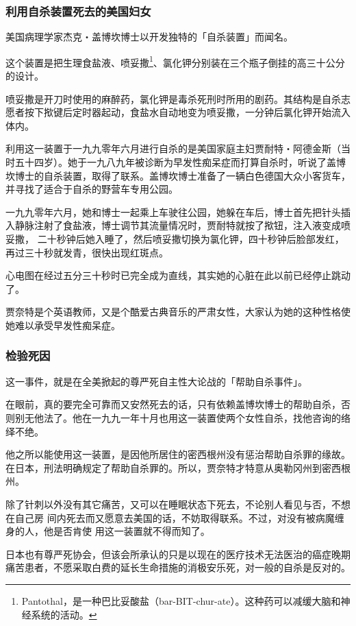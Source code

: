 \documentclass[UTF8]{ctexart}
\begin{document}
\subsubsection*{利用自杀装置死去的美国妇女}

美国病理学家杰克‧盖博坎博士以开发独特的「自杀装置」而闻名。

这个装置是把生理食盐液、喷妥撒\footnote{Pantothal，是一种巴比妥酸盐（bar-BIT-chur-ate）。这种药可以减缓大脑和神经系统的活动。}、氯化钾分别装在三个瓶子倒挂的高三十公分的设计。

喷妥撒是开刀时使用的麻醉药，氯化钾是毒杀死刑时所用的剧药。其结构是自杀志愿者按下揿键后定时器起动，食盐水自动地变为喷妥撒，一分钟后氯化钾开始流入体内。

利用这一装置于一九九零年六月进行自杀的是美国家庭主妇贾耐特‧阿德金斯（当时五十四岁）。她于一九八九年被诊断为早发性痴呆症而打算自杀时，听说了盖博坎博士的自杀装置，取得了联系。盖博坎博士准备了一辆白色德国大众小客货车，并寻找了适合于自杀的野营车专用公园。

一九九零年六月，她和博士一起乘上车驶往公园，她躲在车后，博士首先把针头插入静脉注射了食盐液，博士调节其流量情况时，贾耐特就按了揿钮，注入液变成喷妥撒， 二十秒钟后她入睡了，然后喷妥撒切换为氯化钾，四十秒钟后脸部发红，再过三十秒就发青，很快出现红斑点。

心电图在经过五分三十秒时已完全成为直线，其实她的心脏在此以前已经停止跳动了。

贾奈特是个英语教师，又是个酷爱古典音乐的严肃女性，大家认为她的这种性格使她难以承受早发性痴呆症。

\subsubsection*{检验死因}

这一事件，就是在全美掀起的尊严死自主性大论战的「帮助自杀事件」。

在眼前，真的要完全可靠而又安然死去的话，只有依赖盖博坎博士的帮助自杀，否则别无他法了。他在一九九一年十月也用这一装置使两个女性自杀，找他咨询的络绎不绝。

他之所以能使用这一装置，是因他所居住的密西根州没有惩治帮助自杀罪的缘故。在日本，刑法明确规定了帮助自杀罪的。所以，贾奈特才特意从奥勒冈州到密西根州。

除了针刺以外没有其它痛苦，又可以在睡眠状态下死去，不论别人看见与否，不想在自己房 间内死去而又愿意去美国的话，不妨取得联系。不过，对没有被病魔缠身的人，他是否肯使 用这一装置就不得而知了。

日本也有尊严死协会，但该会所承认的只是以现在的医疗技术无法医治的癌症晚期痛苦患者，不愿采取白费的延长生命措施的消极安乐死，对一般的自杀是反对的。
\end{document}
